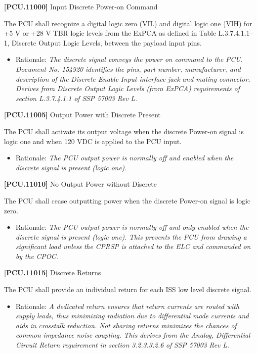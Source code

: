 \textbf{[PCU.11000]} Input Discrete Power-on Command

The \gls{PCU} shall recognize a digital logic zero (VIL) and digital logic one (VIH) for +5 V or +28 V TBR\label{tbx_4} logic levels from the ExPCA as defined in Table L.3.7.4.1.1--1, Discrete Output Logic Levels, between the payload input pins.

\begin{itemize}
\item{} Rationale: \emph{The discrete signal conveys the power on command to the PCU. Document No. 154920 identifies the pins, part number, manufacturer, and description of the Discrete Enable Input interface jack and mating connector. Derives from Discrete Output Logic Levels (from ExPCA) requirements of section L.3.7.4.1.1 of SSP 57003 Rev L.}

\end{itemize}

\textbf{[PCU.11005]} Output Power with Discrete Present

The \gls{PCU} shall activate its output voltage when the discrete Power-on signal is logic one and when 120 \gls{VDC} is applied to the \gls{PCU} input.

\begin{itemize}
\item{} Rationale: \emph{The PCU output power is normally off and enabled when the discrete signal is present (logic one).}

\end{itemize}

\textbf{[PCU.11010]} No Output Power without Discrete

The \gls{PCU} shall cease outputting power when the discrete Power-on signal is logic zero.

\begin{itemize}
\item{} Rationale: \emph{The PCU output power is normally off and only enabled when the discrete signal is present (logic one). This prevents the PCU from drawing a significant load unless the CPRSP is attached to the ELC and commanded on by the CPOC.}

\end{itemize}

\textbf{[PCU.11015]} Discrete Returns

The \gls{PCU} shall provide an individual return for each \gls{ISS} low level discrete signal.

\begin{itemize}
\item{} Rationale: \emph{A dedicated return ensures that return currents are routed with supply leads, thus minimizing radiation due to differential mode currents and aids in crosstalk reduction. Not sharing returns minimizes the chances of common impedance noise coupling. This derives from the Analog, Differential Circuit Return requirement in section 3.2.3.3.2.6 of SSP 57003 Rev L.}

\end{itemize}

